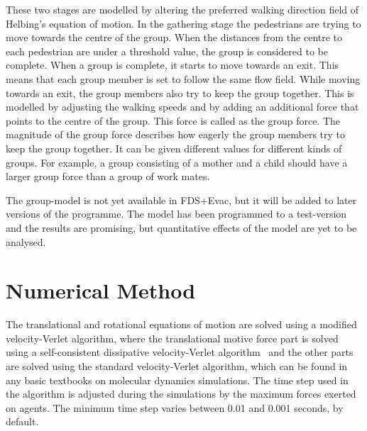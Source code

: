 \documentclass[12pt,a4paper,final,twoside]{stylevk}
\begin{document}
%
These two stages are modelled by altering the preferred walking
direction field of Helbing's equation of motion.  In the gathering
stage the pedestrians are trying to move towards the centre of the
group.  When the distances from the centre to each pedestrian are
under a threshold value, the group is considered to be complete.  When
a group is complete, it starts to move towards an exit.  This means
that each group member is set to follow the same flow field.  While
moving towards an exit, the group members also try to keep the group
together.  This is modelled by adjusting the walking speeds and by
adding an additional force that points to the centre of the group.
This force is called as the group force.  The magnitude of the group
force describes how eagerly the group members try to keep the group
together.  It can be given different values for different kinds of
groups.  For example, a group consisting of a mother and a child
should have a larger group force than a group of work mates.


The group-model is not yet available in FDS+Evac, but it will be added
to later versions of the programme.  The model has been programmed to
a test-version and the results are promising, but quantitative effects
of the model are yet to be analysed.


\section{Numerical Method}\label{Sec_NumMethod}


\noindent The translational and rotational equations of motion are
solved using a modified velocity-Verlet algorithm, where the
translational motive force part is solved using a self-consistent
dissipative velocity-Verlet algorithm~\cite{Vattulainen02} and the
other parts are solved using the standard velocity-Verlet algorithm,
which can be found in any basic textbooks on molecular dynamics
simulations.  The time step used in the algorithm is adjusted during
the simulations by the maximum forces exerted on agents.  The minimum
time step varies between 0.01 and 0.001 seconds, by default.
\end{document}
